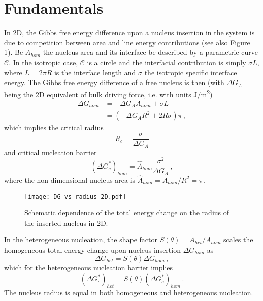 \section{Fundamentals}
In 2D, the Gibbs free energy difference upon a nucleus insertion in the system is due to competition between area and line energy contributions (see also Figure \ref{fig_DG_2D_sketch}). Be $A_{hom}$ the nucleus area and its interface be described by a parametric curve $\mathcal{C}$. In the isotropic case, $\mathcal{C}$ is a circle and the interfacial contribution is simply $\sigma L$, where $L=2\pi R$ is the interface length and $\sigma$ the isotropic specific interface energy. The Gibbs free energy difference of a free nucleus is then (with $\Delta G_A$ being the 2D equivalent of bulk driving force, i.e. with units \unit{J/m^2})
\begin{align}
	\Delta G_{hom} &= -\Delta G_A A_{hom} + \sigma L \\
	\label{eq_DG_hom_iso}	&= (-\Delta G_A R^2 + 2R\sigma)\pi \,,
\end{align}
which implies the critical radius
\begin{equation} \label{eq_crit_radius_2D}
	R_c = \frac{\sigma}{\Delta G_A}
\end{equation}
and critical nucleation barrier
\begin{equation} \label{eq_nucl_barr_hom_2D}
	(\Delta G_c^*)_{hom} = \hat{A}_{hom}\frac{\sigma^2}{\Delta G_A}\,,
\end{equation}
where the non-dimensional nucleus area is $\hat{A}_{hom}=A_{hom}/R^2=\pi$.

\begin{figure}
	\centering
	\texttt{[image: DG\_vs\_radius\_2D.pdf]}
	\caption[Dependence of the total energy change on the radius of the inserted nucleus in 2D]{Schematic dependence of the total energy change on the radius of the inserted nucleus in 2D.}
	\label{fig_DG_2D_sketch}
\end{figure}

In the heterogeneous nucleation, the shape factor $S(\theta)=A_{het}/A_{hom}$ scales the homogeneous total energy change upon nucleus insertion $\Delta G_{hom}$ as
\begin{equation}\label{eq_DG_het_2D}
	\Delta G_{het} = S(\theta)\Delta G_{hom} \,,
\end{equation}
which for the heterogeneous nucleation barrier implies
\begin{equation}\label{eq_nucl_barr_het_2D}
	(\Delta G_c^*)_{het} = S(\theta)(\Delta G_c^*)_{hom}\,.
\end{equation}
The nucleus radius is equal in both homogeneous and heterogeneous nucleation.

